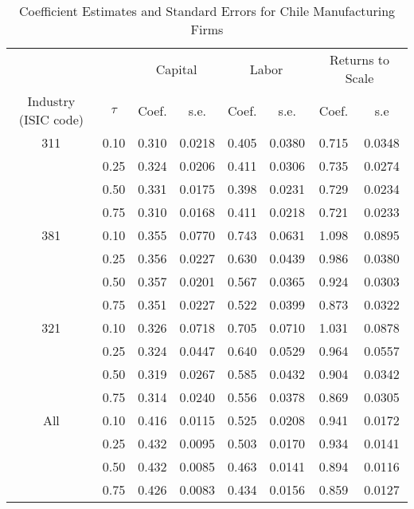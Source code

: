 \begin{table}[ht]
\centering
\caption{Coefficient Estimates and Standard Errors for Chile Manufacturing Firms} 
\begin{tabular}{cccccccc}
  \hline\hline & & \multicolumn{2}{c}{Capital}  & \multicolumn{2}{c}{Labor} & \multicolumn{2}{c}{Returns to Scale} \\ \cmidrule(lr){3-4} \cmidrule(lr){5-6} \cmidrule(lr){7-8}Industry (ISIC code) & $\tau$ & Coef. & s.e. & Coef. & s.e. & Coef. & s.e \\ 
  \hline
311 & 0.10 & 0.310 & 0.0218 & 0.405 & 0.0380 & 0.715 & 0.0348 \\ 
   & 0.25 & 0.324 & 0.0206 & 0.411 & 0.0306 & 0.735 & 0.0274 \\ 
   & 0.50 & 0.331 & 0.0175 & 0.398 & 0.0231 & 0.729 & 0.0234 \\ 
   & 0.75 & 0.310 & 0.0168 & 0.411 & 0.0218 & 0.721 & 0.0233 \\ 
  381 & 0.10 & 0.355 & 0.0770 & 0.743 & 0.0631 & 1.098 & 0.0895 \\ 
   & 0.25 & 0.356 & 0.0227 & 0.630 & 0.0439 & 0.986 & 0.0380 \\ 
   & 0.50 & 0.357 & 0.0201 & 0.567 & 0.0365 & 0.924 & 0.0303 \\ 
   & 0.75 & 0.351 & 0.0227 & 0.522 & 0.0399 & 0.873 & 0.0322 \\ 
  321 & 0.10 & 0.326 & 0.0718 & 0.705 & 0.0710 & 1.031 & 0.0878 \\ 
   & 0.25 & 0.324 & 0.0447 & 0.640 & 0.0529 & 0.964 & 0.0557 \\ 
   & 0.50 & 0.319 & 0.0267 & 0.585 & 0.0432 & 0.904 & 0.0342 \\ 
   & 0.75 & 0.314 & 0.0240 & 0.556 & 0.0378 & 0.869 & 0.0305 \\ 
  All & 0.10 & 0.416 & 0.0115 & 0.525 & 0.0208 & 0.941 & 0.0172 \\ 
   & 0.25 & 0.432 & 0.0095 & 0.503 & 0.0170 & 0.934 & 0.0141 \\ 
   & 0.50 & 0.432 & 0.0085 & 0.463 & 0.0141 & 0.894 & 0.0116 \\ 
   & 0.75 & 0.426 & 0.0083 & 0.434 & 0.0156 & 0.859 & 0.0127 \\ 
   \hline
\end{tabular}
\end{table}
